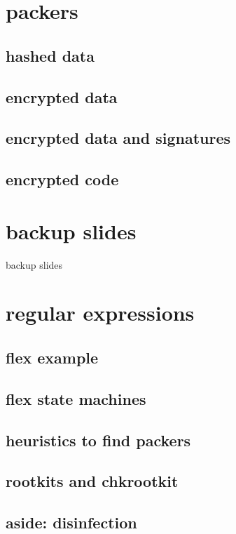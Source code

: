 \section{packers}
\subsection{hashed data}


\subsection{encrypted data}


\subsection{encrypted data and signatures}


\subsection{encrypted code}

\section{backup slides}
\begin{frame}{backup slides}
\end{frame}

\section{regular expressions}


\subsection{flex example}


\subsection{flex state machines}



\subsection{heuristics to find packers}



\subsection{rootkits and chkrootkit}


\subsection{aside: disinfection}

